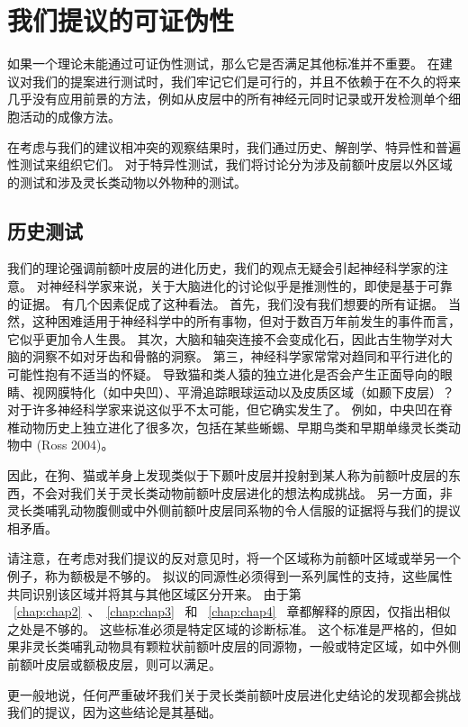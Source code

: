 \section{我们提议的可证伪性}
如果一个理论未能通过可证伪性测试，那么它是否满足其他标准并不重要。 在建议对我们的提案进行测试时，我们牢记它们是可行的，并且不依赖于在不久的将来几乎没有应用前景的方法，例如从皮层中的所有神经元同时记录或开发检测单个细胞活动的成像方法。
\par 
在考虑与我们的建议相冲突的观察结果时，我们通过历史、解剖学、特异性和普遍性测试来组织它们。 对于特异性测试，我们将讨论分为涉及前额叶皮层以外区域的测试和涉及灵长类动物以外物种的测试。
\subsection{历史测试}
我们的理论强调前额叶皮层的进化历史，我们的观点无疑会引起神经科学家的注意。 对神经科学家来说，关于大脑进化的讨论似乎是推测性的，即使是基于可靠的证据。 有几个因素促成了这种看法。 首先，我们没有我们想要的所有证据。 当然，这种困难适用于神经科学中的所有事物，但对于数百万年前发生的事件而言，它似乎更加令人生畏。 其次，大脑和轴突连接不会变成化石，因此古生物学对大脑的洞察不如对牙齿和骨骼的洞察。 第三，神经科学家常常对趋同和平行进化的可能性抱有不适当的怀疑。 导致猫和类人猿的独立进化是否会产生正面导向的眼睛、视网膜特化（如中央凹）、平滑追踪眼球运动以及皮质区域（如颞下皮层）？ 对于许多神经科学家来说这似乎不太可能，但它确实发生了。 例如，中央凹在脊椎动物历史上独立进化了很多次，包括在某些蜥蜴、早期鸟类和早期单缘灵长类动物中 (Ross 2004)。
\par 
因此，在狗、猫或羊身上发现类似于下颞叶皮层并投射到某人称为前额叶皮层的东西，不会对我们关于灵长类动物前额叶皮层进化的想法构成挑战。 另一方面，非灵长类哺乳动物腹侧或中外侧前额叶皮层同系物的令人信服的证据将与我们的提议相矛盾。
\par 
请注意，在考虑对我们提议的反对意见时，将一个区域称为前额叶区域或举另一个例子，称为额极是不够的。 拟议的同源性必须得到一系列属性的支持，这些属性共同识别该区域并将其与其他区域区分开来。 由于第 ~\ref{chap:chap2}~、~\ref{chap:chap3}~ 和 ~\ref{chap:chap4}~ 章都解释的原因，仅指出相似之处是不够的。 这些标准必须是特定区域的诊断标准。 这个标准是严格的，但如果非灵长类哺乳动物具有颗粒状前额叶皮层的同源物，一般或特定区域，如中外侧前额叶皮层或额极皮层，则可以满足。
\par 
更一般地说，任何严重破坏我们关于灵长类前额叶皮层进化史结论的发现都会挑战我们的提议，因为这些结论是其基础。
